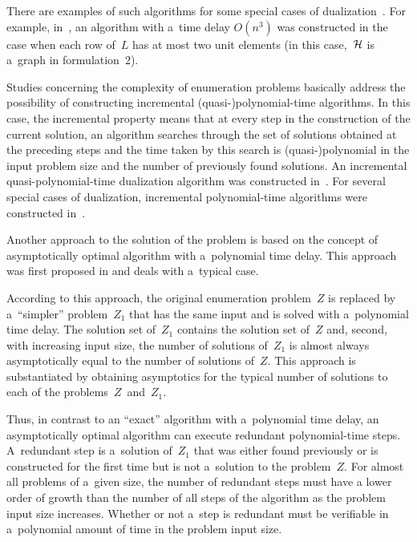\begin{multicols}{2}
{}

There are examples of such algorithms
for some special cases of dualization~\cite{JYP1988, EGM2003}. For
example, in~\cite{JYP1988}, an algorithm with a~time delay $O( n^3)$ 
was constructed in the case when each row of~$L$ has at most
two unit elements (in this case,~$\mathcal{H}$ is a~graph in formulation~2).

Studies concerning the complexity of enumeration problems
basically address the possibility of constructing incremental
(quasi-)polynomial-time algorithms. In this case, the incremental
property means that at every step in the construction of the
current solution, an algorithm searches through the set of
solutions obtained at the preceding steps and the time taken by
this search is (quasi-)polynomial in the input problem size and
the number of previously found solutions. An incremental
quasi-polynomial-time dualization algorithm was constructed 
in~\cite{FK1996,KBEG2006}. For several special cases of dualization,
incremental polynomial-time algorithms were constructed in~\cite{BGEK2000,BE2004a}.

Another approach to the solution of the problem is based on the
concept of asymptotically optimal algorithm with a~polynomial time
delay. This approach was first proposed in \cite{D1977} and deals
with a~typical case.

According to this approach, the original enumeration problem~$Z$
is replaced by a~``simpler'' problem~$Z_1$ that has the same input
and is solved with a~polynomial time delay. The solution set of~$Z_1$ 
contains the solution set of~$Z$ and, second, with
increasing input size, the number of solutions of~$Z_1$ is almost
always asymptotically equal to the number of solutions of~$Z$.
This approach is substantiated by obtaining asymptotics for the
typical number of solutions to each of the problems~$Z$~and~$Z_1$.

Thus, in contrast to an ``exact'' algorithm with a~polynomial time
delay, an asymptotically optimal algorithm can execute redundant
polynomial-time steps. A~redundant step is a~solution of~$Z_1$
that was either found previously or is constructed for the first
time but is not a~solution to the problem~$Z$. For almost all
problems of a~given size, the number of redundant steps must have
a lower order of growth than the number of all steps of the
algorithm as the problem input size increases. Whether or not 
a~step is redundant must be verifiable in a~polynomial amount of
time in the problem input size.


\end{multicols}
